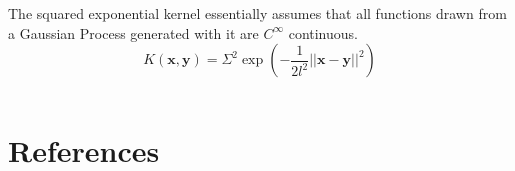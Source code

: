 \documentclass{article}%
\begin{document}
The squared exponential kernel essentially assumes that all functions drawn from a Gaussian Process generated with it 
are $C^\infty$ continuous.  
\begin{equation}
K(\mathbf{x}, \mathbf{y}) = \Sigma^2 \exp{\left(-\frac{1}{2l^2}||\mathbf{x} - \mathbf{y}||^2\right)}
\label{eq:sqrexp}
\end{equation}

\begin{equation}
\label{eq:matern}
\end{equation}




\newpage

\section*{References}
\label{sec:references}


\end{document}
